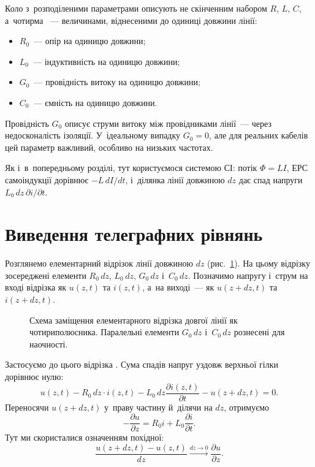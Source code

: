 Коло з~розподіленими параметрами описують не скінченним набором $R$, $L$, $C$, а~чотирма ~--- величинами, віднесеними до одиниці довжини лінії:
\begin{itemize}
	\item $R_0$~--- опір на одиницю довжини;
	\item $L_0$~--- індуктивність на одиницю довжини;
	\item $G_0$~--- провідність витоку на одиницю довжини;
	\item $C_0$~--- ємність на одиницю довжини.
\end{itemize}
Провідність $G_0$ описує струми витоку між провідниками лінії~--- через недосконалість ізоляції. У~ідеальному випадку $G_0 = 0$, але для реальних кабелів цей параметр важливий, особливо на низьких частотах.

Як і~в~попередньому розділі, тут користуємося системою СІ: потік $\Phi=LI$, ЕРС самоіндукції дорівнює
$-L\,dI/dt$, і~ділянка лінії довжиною $dz$ дає спад напруги $L_0\,dz\,\partial i/\partial t$.

\section{Виведення телеграфних рівнянь}\hypertarget{telegraph-equations-derivation}{}

Розглянемо елементарний відрізок лінії довжиною $dz$ (рис.~\ref{tikz:long_line_element}). На цьому відрізку зосереджені елементи $R_0\,dz$, $L_0\,dz$, $G_0\,dz$ і~$C_0\,dz$. Позначимо напругу і~струм на вході відрізка як $u(z,t)$ та $i(z,t)$, а~на виході~--- як $u(z+dz,t)$ та $i(z+dz,t)$.

\begin{figure}[h!]
	\centering
	\caption{Схема заміщення елементарного відрізка довгої лінії як чотириполюсника. Паралельні елементи $G_0\,dz$ і~$C_0\,dz$ рознесені для наочності.}
	\label{tikz:long_line_element}
\end{figure}

Застосуємо до цього відрізка . Сума спадів напруг уздовж верхньої гілки дорівнює нулю:
\begin{equation}\label{eq:telegrapher_KVL}
	u(z,t) - R_0\,dz \cdot i(z,t) - L_0\,dz \frac{\partial i(z,t)}{\partial t} - u(z+dz,t) = 0.
\end{equation}
Переносячи $u(z+dz,t)$ у~праву частину й~ділячи на $dz$, отримуємо
\begin{equation}\label{eq:telegrapher_first}
	-\frac{\partial u}{\partial z} = R_0 i + L_0 \frac{\partial i}{\partial t}.
\end{equation}
Тут ми скористалися означенням похідної:
\begin{equation*}
	\frac{u(z+dz,t) - u(z,t)}{dz} \xrightarrow{dz \to 0} \frac{\partial u}{\partial z}.
\end{equation*}

